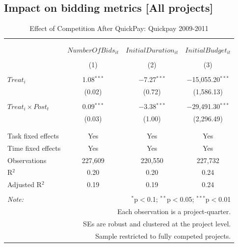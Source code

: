\documentclass[
]{article}
\begin{document}
\hypertarget{impact-on-bidding-metrics-all-projects}{%
\subsection{Impact on bidding metrics {[}All
projects{]}}\label{impact-on-bidding-metrics-all-projects}}

\begin{table}[H] \centering 
  \caption{Effect of Competition After QuickPay: Quickpay 2009-2011} 
  \label{} 
\small 
\begin{tabular}{@{\extracolsep{0pt}}lccc} 
\\[-1.8ex]\hline 
\hline \\[-1.8ex] 
\\[-1.8ex] & $NumberOfBids_{it}$ & $InitialDuration_{it}$ & $InitialBudget_{it}$ \\ 
\\[-1.8ex] & (1) & (2) & (3)\\ 
\hline \\[-1.8ex] 
 $Treat_i$ & 1.08$^{***}$ & $-$7.27$^{***}$ & $-$15,055.20$^{***}$ \\ 
  & (0.02) & (0.72) & (1,586.13) \\ 
  & & & \\ 
 $Treat_i \times Post_t$ & 0.09$^{***}$ & $-$3.38$^{***}$ & $-$29,491.30$^{***}$ \\ 
  & (0.03) & (1.00) & (2,296.49) \\ 
  & & & \\ 
\hline \\[-1.8ex] 
Task fixed effects & Yes & Yes & Yes \\ 
Time fixed effects & Yes & Yes & Yes \\ 
Observations & 227,609 & 220,550 & 227,732 \\ 
R$^{2}$ & 0.20 & 0.20 & 0.24 \\ 
Adjusted R$^{2}$ & 0.19 & 0.19 & 0.24 \\ 
\hline 
\hline \\[-1.8ex] 
\textit{Note:}  & \multicolumn{3}{r}{$^{*}$p$<$0.1; $^{**}$p$<$0.05; $^{***}$p$<$0.01} \\ 
 & \multicolumn{3}{r}{Each observation is a project-quarter.} \\ 
 & \multicolumn{3}{r}{SEs are robust and clustered at the project level.} \\ 
 & \multicolumn{3}{r}{Sample restricted to fully competed projects.} \\ 
\end{tabular} 
\end{table}
\end{document}
